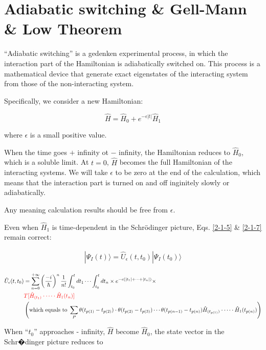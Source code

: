 ﻿\documentclass[twoside]{book}
\numberwithin{equation}{section}
\begin{document}
\section{Adiabatic switching \& Gell-Mann \& Low Theorem}

``Adiabatic switching'' is a gedenken experimental process, in which the interaction part of the Hamiltonian is adiabatically switched on. This process is a mathematical device that generate exact eigenstates of the interacting system from those of the non-interacting system. 

Specifically, we consider a new Hamiltonian:

\[\hat{H}=\hat{H}_0+e^{-\epsilon|t|}\hat{H}_1 \]

where $\epsilon$ is a small positive value. 

When the time goes $+$ infinity ot $-$ infinity, the Hamiltonian reduces to $\hat{H}_0$, which is a soluble limit. At $t=0$, $\hat{H}$ becomes the full Hamiltonian of the interacting systems. We will take $\epsilon$ to be zero at the end of the calculation, which means that the interaction part is turned on and off inginitely slowly or adiabatically. 

Any meaning calculation results should be free from $\epsilon$. 

Even when $\hat{H}_1$ is time-dependent in the Schr\"{o}dinger picture, Eqs. \eqref{2-1-5} \& \eqref{2-1-7} remain correct:

\begin{align}
|\Psi_I(t)\rangle=\hat{U}_\epsilon(t,t_0)|\Psi_I(t_0)\rangle
\end{align}

\begin{align}\label{2-2-2}
\hat{U}_\epsilon(t,t_0)&=\sum_{n=0}^{+\infty}\left(\frac{-i}{\hbar}\right)^n\frac{1}{n!}\int_{t_0}^t dt_1 \cdots \int_{t_0}^t dt_n\times e^{-\epsilon(|t_1|+\cdots+|t_n|)}\times\\
\nonumber&{\color{red}{T[\hat{H}_{(t_1)}\cdot\cdots\cdot\hat{H}_1(t_n)]}}\\
\nonumber&\left(\text{which equals to\ }\sum_P\theta(t_{p(1)}-t_{p(2)})\cdot\theta(t_{p(2)}-t_{p(3)})\cdots\theta(t_{p(n-1)}-t_{p(n)}) \hat{H}_{(t_{p(1)})}\cdot\cdots\cdot\hat{H}_1(t_{p(n)})\right)
\end{align}



When ``$t_0$'' approaches - infinity, $\hat{H}$ become $\hat{H}_0$, the state vector in the Schr�dinger picture reduces to
\end{document}

